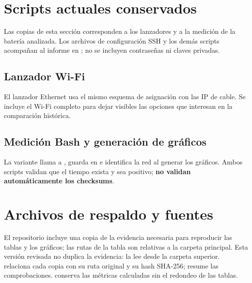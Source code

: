 \section{Scripts actuales conservados}

Las copias de esta sección corresponden a los lanzadores y a la medición de la batería analizada. Los archivos de configuración SSH y los demás scripts acompañan al informe en ; no se incluyen contraseñas ni claves privadas.

\subsection{Lanzador Wi-Fi}
El lanzador Ethernet usa el mismo esquema de asignación con las IP de cable. Se incluye el Wi-Fi completo para dejar visibles las opciones que interesan en la comparación histórica.


\subsection{Medición Bash y generación de gráficos}

La variante  llama a , guarda en  e identifica la red al generar los gráficos. Ambos scripts validan que el tiempo exista y sea positivo; \textbf{no validan automáticamente los checksums}.

\section{Archivos de respaldo y fuentes}

El repositorio  incluye una copia de la evidencia necesaria para reproducir las tablas y los gráficos; las rutas de la tabla son relativas a la carpeta principal. Esta versión revisada no duplica la evidencia: la lee desde la carpeta superior.  relaciona cada copia con su ruta original y su hash SHA-256;  resume las comprobaciones.  conserva las métricas calculadas sin el redondeo de las tablas.

